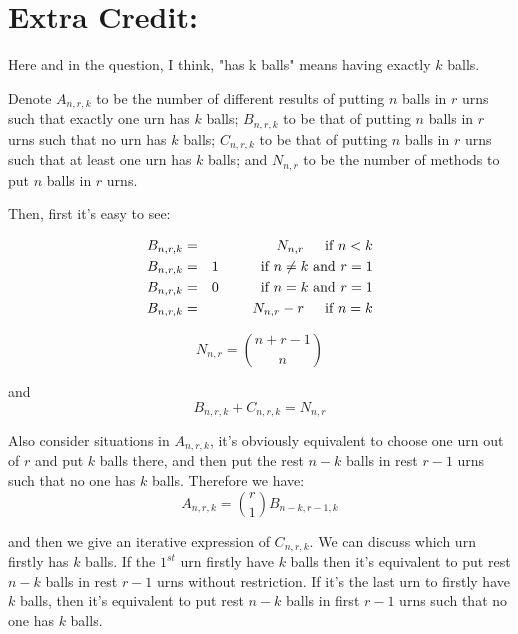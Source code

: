 \documentclass[12pt]{article}
\begin{document}
\section*{\normalsize{Extra Credit:}}

Here and in the question, I think, "has k balls" means having exactly $k$ balls.

Denote $A_{n,r,k}$ to be the number of different results of putting $n$ balls in $r$ urns such that exactly one urn has $k$ balls; $B_{n,r,k}$ to be that of putting $n$ balls in $r$ urns such that no urn has $k$ balls;  $C_{n,r,k}$ to be that of putting $n$ balls in $r$ urns such that at least one urn has $k$ balls; and $N_{n,r}$ to be the number of methods to put $n$ balls in $r$ urns.

Then, first it's easy to see:

\begin{eqnarray} \label{Binit}
B_{n,r,k} &=& N_{n,r} \hspace{1.5em} \text{if $n < k$} \\
B_{n,r,k} &=& 1 \hspace{3em} \text{if $n \neq k$ and $r = 1$} \\
B_{n,r,k} &=& 0 \hspace{3em} \text{if $n = k$ and $r = 1$} \\
B_{n,r,k} &=& N_{n,r} - r \hspace{1.5em} \text{if $n = k$} 
\end{eqnarray}

\begin{equation} \label{Ninit}
N_{n,r} = \binom{n+r-1}{n}
\end{equation}

and 
\begin{equation} \label{BC}
B_{n,r,k} + C_{n,r,k} = N_{n,r}
\end{equation}

Also consider situations in $A_{n,r,k}$, it's obviously equivalent to choose one urn out of $r$ and put $k$ balls there, and then put the rest $n-k$ balls in rest $r-1$ urns such that no one has $k$ balls. Therefore we have:
\begin{equation} \label{A} 
A_{n,r,k} = \binom{r}{1} B_{n-k,r-1,k}
\end{equation}

and then we give an iterative expression of $C_{n,r,k}$. We can discuss which urn firstly has $k$ balls. If the $1^{st}$ urn firstly have $k$ balls then it's equivalent to put rest $n-k$ balls in rest $r-1$ urns without restriction. If it's the last urn to firstly have $k$ balls, then it's equivalent to put rest $n-k$ balls in first $r-1$ urns such that no one has $k$ balls.
\end{document}
